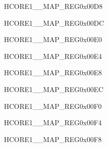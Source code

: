 \begin{register}{H}{CORE1\_\_MAP\_REG}{0x00D8}\label{regdesc:CORE1SYSTIMERTARGET1INTMAPREG}
\end{register}\vspace{-3em}


\begin{register}{H}{CORE1\_\_MAP\_REG}{0x00DC}\label{regdesc:CORE1SYSTIMERTARGET2INTMAPREG}
\end{register}\vspace{-3em}


\begin{register}{H}{CORE1\_\_MAP\_REG}{0x00E0}\label{regdesc:CORE1AHBPDMAINCH0INTMAPREG}
\end{register}\vspace{-3em}


\begin{register}{H}{CORE1\_\_MAP\_REG}{0x00E4}\label{regdesc:CORE1AHBPDMAINCH1INTMAPREG}
\end{register}\vspace{-3em}


\begin{register}{H}{CORE1\_\_MAP\_REG}{0x00E8}\label{regdesc:CORE1AHBPDMAINCH2INTMAPREG}
\end{register}\vspace{-3em}


\begin{register}{H}{CORE1\_\_MAP\_REG}{0x00EC}\label{regdesc:CORE1AHBPDMAOUTCH0INTMAPREG}
\end{register}\vspace{-3em}


\begin{register}{H}{CORE1\_\_MAP\_REG}{0x00F0}\label{regdesc:CORE1AHBPDMAOUTCH1INTMAPREG}
\end{register}\vspace{-3em}


\begin{register}{H}{CORE1\_\_MAP\_REG}{0x00F4}\label{regdesc:CORE1AHBPDMAOUTCH2INTMAPREG}
\end{register}\vspace{-3em}


\begin{register}{H}{CORE1\_\_MAP\_REG}{0x00F8}\label{regdesc:CORE1AXIPDMAINCH0INTMAPREG}
\end{register}\vspace{-3em}


